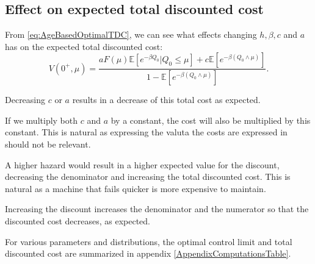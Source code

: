 \subsection{Effect on expected total discounted cost}
From \eqref{eq:AgeBasedOptimalTDC}, we can see what effects changing $h,\beta,c$ and $a$ has on the expected total discounted cost:
\[V(0^+,\mu)=\frac{aF(\mu)\mathbb{E}[e^{-\beta Q_0}|Q_0\leq \mu]+c\mathbb{E}[e^{-\beta(Q_0\wedge\mu)}]}{1-\mathbb{E}[e^{-\beta (Q_0\wedge\mu)}]}.\]
\begin{remark}
	Decreasing $c$ or $a$ results in a decrease of this total cost as expected.
\end{remark}
\begin{remark}\label{remark:AgeBasedCostRatio}
	If we multiply both $c$ and $a$ by a constant, the cost will also be multiplied by this constant.
	This is natural as expressing the valuta the costs are expressed in should not be relevant.
\end{remark}
\begin{remark}
	A higher hazard would result in a higher expected value for the discount, decreasing the denominator and increasing the total discounted cost.
	This is natural as a machine that fails quicker is more expensive to maintain.
\end{remark}
\begin{remark}\label{remark:AgeBasedTDCDiscountIncrease}
	Increasing the discount increases the denominator and the numerator so that the discounted cost decreases, as expected.
\end{remark}
For various parameters and distributions, the optimal control limit and total discounted cost are summarized in appendix \ref{AppendixComputationsTable}.